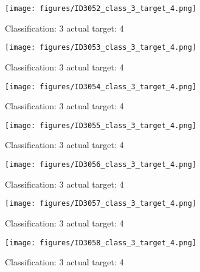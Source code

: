 \begin{figure}[h!]
\begin{center}
\texttt{[image: figures/ID3052\_class\_3\_target\_4.png]}
\end{center}
\caption{ Classification: 3 actual target: 4}
\label{fig:ID3052_class_3_target_4}
\end{figure}
\begin{figure}[h!]
\begin{center}
\texttt{[image: figures/ID3053\_class\_3\_target\_4.png]}
\end{center}
\caption{ Classification: 3 actual target: 4}
\label{fig:ID3053_class_3_target_4}
\end{figure}
\begin{figure}[h!]
\begin{center}
\texttt{[image: figures/ID3054\_class\_3\_target\_4.png]}
\end{center}
\caption{ Classification: 3 actual target: 4}
\label{fig:ID3054_class_3_target_4}
\end{figure}
\begin{figure}[h!]
\begin{center}
\texttt{[image: figures/ID3055\_class\_3\_target\_4.png]}
\end{center}
\caption{ Classification: 3 actual target: 4}
\label{fig:ID3055_class_3_target_4}
\end{figure}
\begin{figure}[h!]
\begin{center}
\texttt{[image: figures/ID3056\_class\_3\_target\_4.png]}
\end{center}
\caption{ Classification: 3 actual target: 4}
\label{fig:ID3056_class_3_target_4}
\end{figure}
\begin{figure}[h!]
\begin{center}
\texttt{[image: figures/ID3057\_class\_3\_target\_4.png]}
\end{center}
\caption{ Classification: 3 actual target: 4}
\label{fig:ID3057_class_3_target_4}
\end{figure}
\begin{figure}[h!]
\begin{center}
\texttt{[image: figures/ID3058\_class\_3\_target\_4.png]}
\end{center}
\caption{ Classification: 3 actual target: 4}
\label{fig:ID3058_class_3_target_4}
\end{figure}

